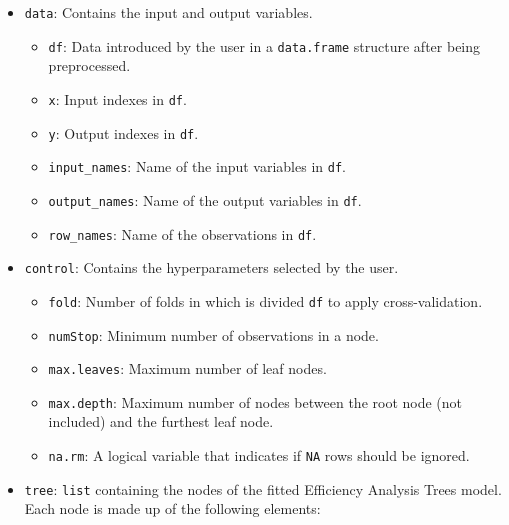 \begin{itemize}
\tightlist
\item
  \texttt{data}: Contains the input and output variables.

  \begin{itemize}
  \tightlist
  \item
    \texttt{df}: Data introduced by the user in a \texttt{data.frame} structure after being preprocessed.
  \item
    \texttt{x}: Input indexes in \texttt{df}.
  \item
    \texttt{y}: Output indexes in \texttt{df}.
  \item
    \texttt{input\_names}: Name of the input variables in \texttt{df}.
  \item
    \texttt{output\_names}: Name of the output variables in \texttt{df}.
  \item
    \texttt{row\_names}: Name of the observations in \texttt{df}.
  \end{itemize}
\item
  \texttt{control}: Contains the hyperparameters selected by the user.

  \begin{itemize}
  \tightlist
  \item
    \texttt{fold}: Number of folds in which is divided \texttt{df} to apply cross-validation.
  \item
    \texttt{numStop}: Minimum number of observations in a node.
  \item
    \texttt{max.leaves}: Maximum number of leaf nodes.
  \item
    \texttt{max.depth}: Maximum number of nodes between the root node (not included) and the furthest leaf node.
  \item
    \texttt{na.rm}: A logical variable that indicates if \texttt{NA} rows should be ignored.
  \end{itemize}
\item
  \texttt{tree}: \texttt{list} containing the nodes of the fitted Efficiency Analysis Trees model. Each node is made up of the following elements:


\end{itemize}
